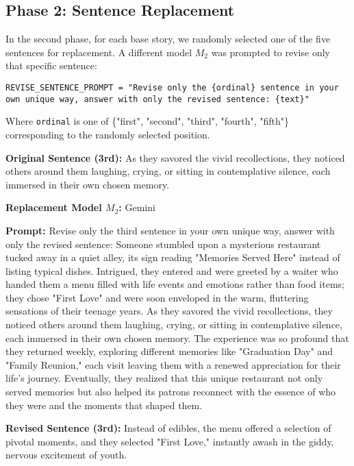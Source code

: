 \documentclass{article}
\begin{document}
\subsection{Phase 2: Sentence Replacement}
In the second phase, for each base story, we randomly selected one of the five sentences for replacement. A different model $M_2$ was prompted to revise only that specific sentence:

\begin{lstlisting}
REVISE_SENTENCE_PROMPT = "Revise only the {ordinal} sentence in your own unique way, answer with only the revised sentence: {text}"
\end{lstlisting}

Where \texttt{ordinal} is one of \{"first", "second", "third", "fourth", "fifth"\} corresponding to the randomly selected position.

\begin{tcolorbox}[colback=lightblue, colframe=blue!50!black, title=Example 2: Sentence Replacement]
\textbf{Original Sentence (3rd):} As they savored the vivid recollections, they noticed others around them laughing, crying, or sitting in contemplative silence, each immersed in their own chosen memory.

\textbf{Replacement Model $M_2$:} Gemini 

\textbf{Prompt:} Revise only the third sentence in your own unique way, answer with only the revised sentence: Someone stumbled upon a mysterious restaurant tucked away in a quiet alley, its sign reading "Memories Served Here" instead of listing typical dishes. Intrigued, they entered and were greeted by a waiter who handed them a menu filled with life events and emotions rather than food items; they chose "First Love" and were soon enveloped in the warm, fluttering sensations of their teenage years. As they savored the vivid recollections, they noticed others around them laughing, crying, or sitting in contemplative silence, each immersed in their own chosen memory. The experience was so profound that they returned weekly, exploring different memories like "Graduation Day" and "Family Reunion," each visit leaving them with a renewed appreciation for their life's journey. Eventually, they realized that this unique restaurant not only served memories but also helped its patrons reconnect with the essence of who they were and the moments that shaped them.

\textbf{Revised Sentence (3rd):} 
Instead of edibles, the menu offered a selection of pivotal moments, and they selected "First Love," instantly awash in the giddy, nervous excitement of youth.

\end{tcolorbox}
\end{document}
